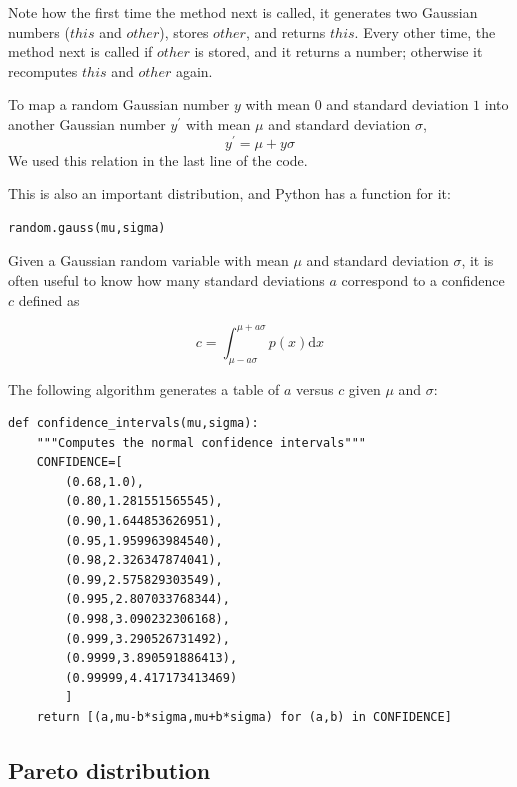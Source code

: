 \documentclass[justified,sixbynine]{tufte-book}
\def\ft{\small\tt}
\theoremstyle{plain}%
\theoremstyle{definition}
\theoremstyle{remark}
\begin{document}
\begin{fullwidth}
Note how the first time the method next is called, it generates two Gaussian
numbers ($this$ and $other$), stores $other$, and returns $this$. Every other
time, the method next is called if $other$ is stored, and it returns a number;
otherwise it recomputes $this$ and $other$ again.

To map a random Gaussian number $y$ with mean $0$ and standard deviation $1$
into another Gaussian number $y^{\prime }$ with mean $\mu $ and standard
deviation $\sigma $,
\begin{equation}
y^{\prime }=\mu +y\sigma
\end{equation}
We used this relation in the last line of the code.

This is also an important distribution, and Python has a function for it:

\begin{lstlisting}
random.gauss(mu,sigma)
\end{lstlisting}

Given a Gaussian random variable with mean $\mu$ and standard deviation $\sigma$, it is often useful to know how many standard deviations $a$ correspond to a confidence $c$ defined as

\begin{equation}
c = \int_{\mu-a\sigma}^{\mu+a\sigma} p(x)\textrm{d}x
\end{equation}

The following algorithm generates a table of $a$ versus $c$ given $\mu$ and $\sigma$:


\begin{lstlisting}[caption={in file: {\ft nlib.py}}]
def confidence_intervals(mu,sigma):
    """Computes the normal confidence intervals"""
    CONFIDENCE=[
        (0.68,1.0),
        (0.80,1.281551565545),
        (0.90,1.644853626951),
        (0.95,1.959963984540),
        (0.98,2.326347874041),
        (0.99,2.575829303549),
        (0.995,2.807033768344),
        (0.998,3.090232306168),
        (0.999,3.290526731492),
        (0.9999,3.890591886413),
        (0.99999,4.417173413469)
        ]
    return [(a,mu-b*sigma,mu+b*sigma) for (a,b) in CONFIDENCE]
\end{lstlisting}


\goodbreak\subsection{Pareto distribution}


\end{fullwidth}
\end{document}
